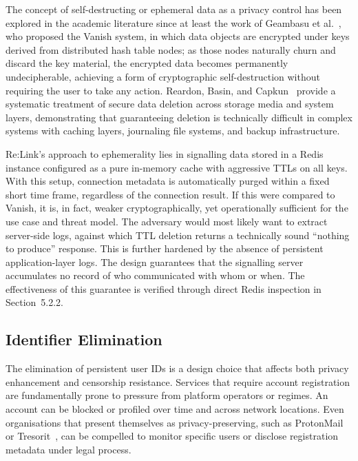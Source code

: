 \documentclass[12pt,a4paper,oneside]{report}
\begin{document}
The concept of self-destructing or ephemeral data as a privacy control has been explored in the academic literature since at least the work of Geambasu et al.~\cite{geambasu2009}, who proposed the Vanish system, in which data objects are encrypted under keys derived from distributed hash table nodes; as those nodes naturally churn and discard the key material, the encrypted data becomes permanently undecipherable, achieving a form of cryptographic self-destruction without requiring the user to take any action. Reardon, Basin, and Capkun~\cite{reardon2013} provide a systematic treatment of secure data deletion across storage media and system layers, demonstrating that guaranteeing deletion is technically difficult in complex systems with caching layers, journaling file systems, and backup infrastructure.

Re:Link's approach to ephemerality lies in signalling data stored in a Redis instance configured as a pure in-memory cache with aggressive TTLs on all keys. With this setup, connection metadata is automatically purged within a fixed short time frame, regardless of the connection result. If this were compared to Vanish, it is, in fact, weaker cryptographically, yet operationally sufficient for the use case and threat model. The adversary would most likely want to extract server-side logs, against which TTL deletion returns a technically sound ``nothing to produce'' response. This is further hardened by the absence of persistent application-layer logs. The design guarantees that the signalling server accumulates no record of who communicated with whom or when. The effectiveness of this guarantee is verified through direct Redis inspection in Section~5.2.2.


\subsection{Identifier Elimination}
\label{sec:identifier-elimination}

The elimination of persistent user IDs is a design choice that affects both privacy enhancement and censorship resistance. Services that require account registration are fundamentally prone to pressure from platform operators or regimes. An account can be blocked or profiled over time and across network locations. Even organisations that present themselves as privacy-preserving, such as ProtonMail~\cite{protonmail} or Tresorit~\cite{tresorit}, can be compelled to monitor specific users or disclose registration metadata under legal process.
\end{document}
